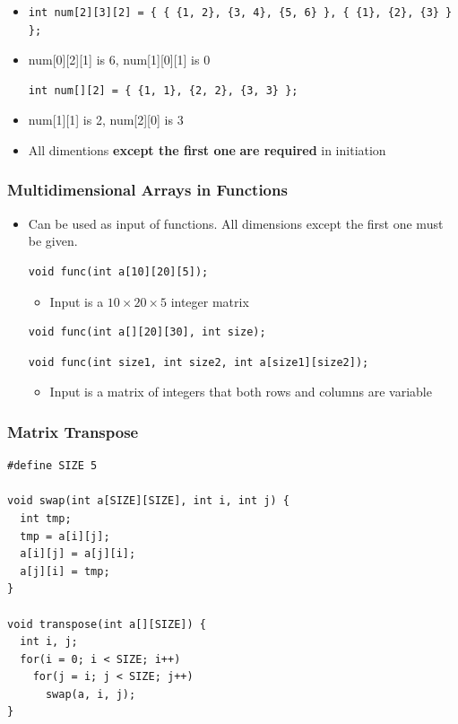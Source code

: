 \documentclass{../c-lecture}
\begin{document}
\begin{frame}[fragile]
  \begin{itemize}
    \item[]
    \begin{verbatim}
int num[2][3][2] = { { {1, 2}, {3, 4}, {5, 6} }, { {1}, {2}, {3} } };
    \end{verbatim}
    \item num[0][2][1] is 6, num[1][0][1] is 0
    \begin{verbatim}
int num[][2] = { {1, 1}, {2, 2}, {3, 3} };
    \end{verbatim}
    \item num[1][1] is 2, num[2][0] is 3
    \item
      All dimentions
      \textbf{\color{Orange} except the first one} \textbf{\color{Yellow} are required} in
      initiation
  \end{itemize}
\end{frame}

\begin{frame}[fragile]
  \frametitle{Multidimensional Arrays in Functions}
  \begin{itemize}
    \item
      Can be used as input of functions. All dimensions except the first one
      {\color{YellowOrange} must} be given.

    \begin{verbatim}
void func(int a[10][20][5]);
    \end{verbatim}
    \begin{itemize}
      \item Input is a $10 \times 20 \times 5$ integer matrix
    \end{itemize}
    \begin{verbatim}
void func(int a[][20][30], int size);
    \end{verbatim}
    \begin{verbatim}
void func(int size1, int size2, int a[size1][size2]);
    \end{verbatim}
    \begin{itemize}
      \item
        Input is a matrix of integers that both rows and columns are variable
    \end{itemize}
  \end{itemize}
\end{frame}

\begin{frame}[fragile]
  \frametitle{Matrix Transpose}
  \scriptsize
  \begin{verbatim}
#define SIZE 5

void swap(int a[SIZE][SIZE], int i, int j) {
  int tmp;
  tmp = a[i][j];
  a[i][j] = a[j][i];
  a[j][i] = tmp;
}

void transpose(int a[][SIZE]) {
  int i, j;
  for(i = 0; i < SIZE; i++)
    for(j = i; j < SIZE; j++)
      swap(a, i, j);
}
  \end{verbatim}
\end{frame}
\end{document}
